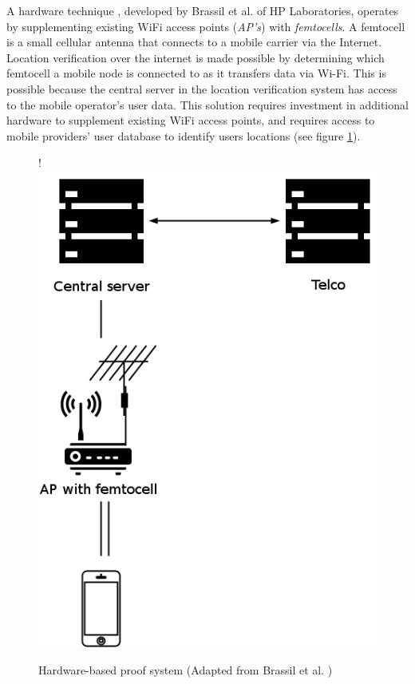A hardware technique \cite{brassil}, developed by Brassil et al. of HP Laboratories, operates by supplementing existing WiFi access points (\textit{AP's}) with \textit{femtocells}. A femtocell is a small cellular antenna that connects to a mobile carrier via the Internet. Location verification over the internet is made possible by determining which femtocell a mobile node is connected to as it transfers data via Wi-Fi. This is possible because the central server in the location verification system has access to the mobile operator's user data. This solution requires investment in additional hardware to supplement existing WiFi access points, and requires access to mobile providers' user database to identify users locations (see figure \ref{fig:hp_labs}).

\begin{figure}[H]
\begin{center}
 {!} {\includegraphics{diagrams/hp_paper.png}}
\caption{Hardware-based proof system (Adapted from Brassil et al. \cite{brassil})}
\label{fig:hp_labs}
\end{center}
\end{figure}

